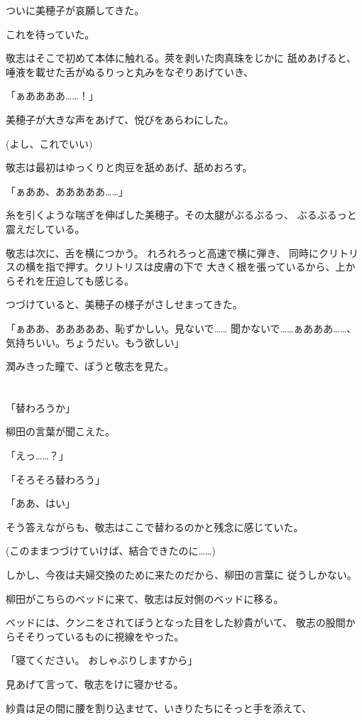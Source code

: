 ﻿\documentclass[
    book,tate,
    line_length=30zw,
    jafontsize=12pt,
    paper=b5j,
    landscape,
    ]{jlreq}
\begin{document}
ついに美穂子が哀願してきた。

これを待っていた。

敬志はそこで初めて本体に触れる。莢を剥いた肉真珠をじかに
舐めあげると、唾液を載せた舌がぬるりっと丸みをなぞりあげていき、

「ぁああああ……！」

美穂子が大きな声をあげて、悦びをあらわにした。

(よし、これでいい)

敬志は最初はゆっくりと肉豆を舐めあげ、舐めおろす。

「ぁああ、あああああ……」

糸を引くような喘ぎを伸ばした美穂子。その太腿がぶるぶるっ、
ぶるぶるっと震えだしている。

敬志は次に、舌を横につかう。 れろれろっと高速で横に弾き、
同時にクリトリスの横を指で押す。クリトリスは皮膚の下で
大きく根を張っているから、上からそれを圧迫しても感じる。

つづけていると、美穂子の様子がさしせまってきた。

「ぁああ、あああああ、恥ずかしい。見ないで……
聞かないで……ぁあああ……、気持ちいい。ちょうだい。もう欲しい」

潤みきった瞳で、ぼうと敬志を見た。

\section*{}

「替わろうか」

柳田の言葉が聞こえた。

「えっ……？」

「そろそろ替わろう」

「ああ、はい」

そう答えながらも、敬志はここで替わるのかと残念に感じていた。

(このままつづけていけば、結合できたのに……)

しかし、今夜は夫婦交換のために来たのだから、柳田の言葉に
従うしかない。

柳田がこちらのベッドに来て、敬志は反対側のベッドに移る。

ベッドには、クンニをされてぼうとなった目をした紗貴がいて、
敬志の股間からそそりっているものに視線をやった。

「寝てください。 おしゃぶりしますから」

見あげて言って、敬志をけに寝かせる。

紗貴は足の間に腰を割り込ませて、いきりたちにそっと手を添えて、
\end{document}
